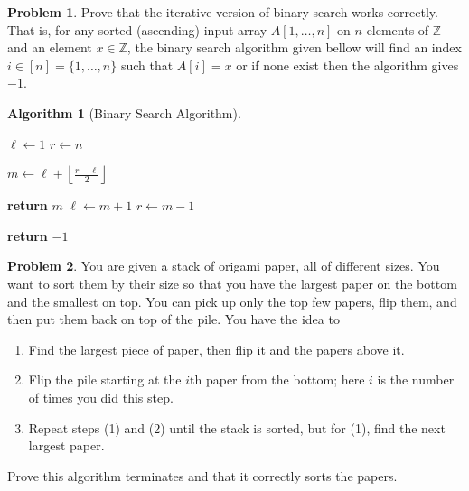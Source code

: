 \documentclass{article}
\newcommand{\Z}{\mathbb{Z}}
\theoremstyle{plain}
\theoremstyle{definition}
\newtheorem{problem}{Problem}
\newtheorem{algorithm}{Algorithm}
\begin{document}
\begin{problem}\label{prob_bin_search_li}
    Prove that the iterative version of binary search works correctly. That is, for any sorted (ascending) input array \(A[1,\dotsc, n]\) on \(n\) elements of \(\Z\) and an element \(x \in \Z\), the binary search algorithm given bellow will find an index \(i \in [n] = \{1, \dotsc, n\}\) such that \(A[i] = x\) or if none exist then the algorithm gives \(-1\).

    \begin{algorithm}[Binary Search Algorithm] \phantom{}\label{alg_bsearch}
        \begin{center}
        \begin{minipage}{.5\linewidth}
        \begin{algorithmic}[1]
                \State \(\ell \leftarrow 1\)
                \State \(r \leftarrow n\)
    
                    \State \(m \leftarrow \ell + \left\lfloor\frac{r - \ell}{2}\right\rfloor\)
        
                        \State \textbf{return} \(m\)
                        \State \(\ell \leftarrow m + 1\)
                    \Else
                        \State \(r \leftarrow m - 1\)
                    \EndIf
                        
                \EndWhile	
                   
                \State \textbf{return} \(-1\)
            \EndProcedure
        \end{algorithmic}
        \end{minipage}
        \end{center}
        \end{algorithm}
\end{problem}

\begin{problem}
    You are given a stack of origami paper, all of different sizes. You want to sort them by their size so that you have the largest paper on the bottom and the smallest on top. You can pick up only the top few papers, flip them, and then put them back on top of the pile. You have the idea to
    \begin{enumerate}
        \item Find the largest piece of paper, then flip it and the papers above it.
        \item Flip the pile starting at the \(i\)th paper from the bottom; here \(i\) is the number of times you did this step.
        \item Repeat steps (1) and (2) until the stack is sorted, but for (1), find the next largest paper.
    \end{enumerate}
    Prove this algorithm terminates and that it correctly sorts the papers.
\end{problem}
\end{document}
